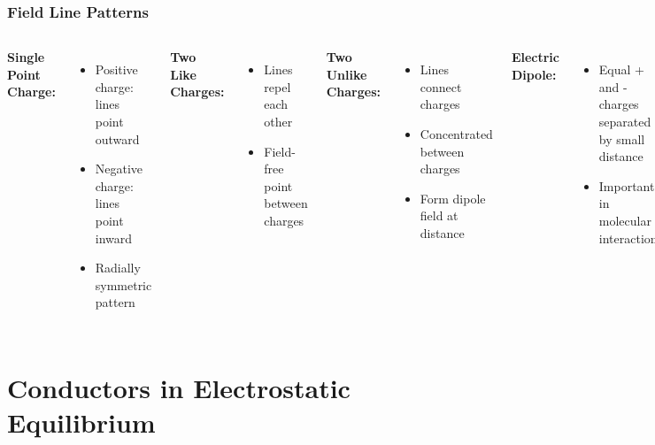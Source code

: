 \documentclass{beamer}
\newcommand{\highlight}[1]{\textcolor{ds9red}{#1}}
\begin{document}
\begin{frame}
    \frametitle{Field Line Patterns}
    
    \begin{columns}[t]
        \textbf{Single Point Charge:}
        \begin{itemize}
            \item Positive charge: lines point \highlight{outward}
            \item Negative charge: lines point \highlight{inward}
            \item Radially symmetric pattern
        \end{itemize}
        
        \textbf{Two Like Charges:}
        \begin{itemize}
            \item Lines repel each other
            \item Field-free point between charges
        \end{itemize}
        
        \textbf{Two Unlike Charges:}
        \begin{itemize}
            \item Lines connect charges
            \item Concentrated between charges
            \item Form dipole field at distance
        \end{itemize}
        
        \textbf{Electric Dipole:}
        \begin{itemize}
            \item Equal + and - charges separated by small distance
            \item Important in molecular interactions
        \end{itemize}
    \end{columns}
\end{frame}

\section{Conductors in Electrostatic Equilibrium}
\end{document}
